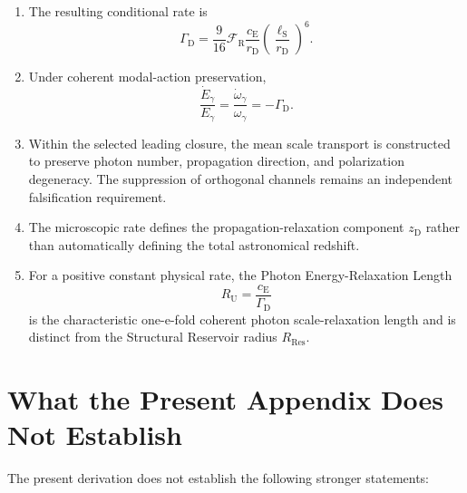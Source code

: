 \begin{enumerate}
    \item The resulting conditional rate is
    \begin{equation}
        \boxed{
        \Gamma_{\mathrm D}
        =
        \frac{9}{16}
        \mathcal F_{\mathrm R}
        \frac{
            c_{\mathrm E}
        }{
            r_{\mathrm D}
        }
        \left(
            \frac{
                \ell_{\mathrm S}
            }{
                r_{\mathrm D}
            }
        \right)^6.
        }
    \end{equation}

    \item Under coherent modal-action preservation,
    \begin{equation}
        \frac{
            \dot E_{\gamma}
        }{
            E_{\gamma}
        }
        =
        \frac{
            \dot\omega_{\gamma}
        }{
            \omega_{\gamma}
        }
        =
        -\Gamma_{\mathrm D}.
    \end{equation}

    \item Within the selected leading closure, the mean scale transport is
    constructed to preserve photon number, propagation direction, and
    polarization degeneracy. The suppression of orthogonal channels remains
    an independent falsification requirement.

    \item The microscopic rate defines the propagation-relaxation component
    $z_{\mathrm D}$ rather than automatically defining the total astronomical
    redshift.

    \item For a positive constant physical rate, the Photon Energy-Relaxation Length
    \begin{equation}
        R_{\mathrm U}
        =
        \frac{
            c_{\mathrm E}
        }{
            \Gamma_{\mathrm D}
        }
    \end{equation}
    is the characteristic one-e-fold coherent photon scale-relaxation length
    and is distinct from the Structural Reservoir radius
    $R_{\mathrm{Res}}$.
\end{enumerate}


\section{What the Present Appendix Does Not Establish}

The present derivation does not establish the following stronger statements:

